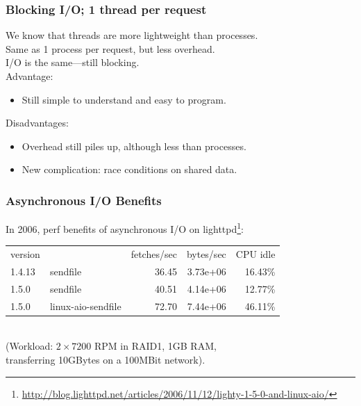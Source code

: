 \begin{frame}
  \frametitle{Blocking I/O; 1 thread per request}

  
    We know that threads are more lightweight than processes.\\[1em]

    Same as 1 process per request, but less overhead.\\[1em]

    I/O is the same---still blocking.\\[1em]

    Advantage:
    \begin{itemize}
      \item Still simple to understand and easy to program.
    \end{itemize}

    Disadvantages:
    \begin{itemize}
      \item Overhead still piles up, although less than processes.
      \item New complication: race conditions on shared data.
    \end{itemize}
  
\end{frame}

\begin{frame}
  \frametitle{Asynchronous I/O Benefits}

  
    In 2006, perf benefits of asynchronous I/O on lighttpd\footnote{\tiny \url{http://blog.lighttpd.net/articles/2006/11/12/lighty-1-5-0-and-linux-aio/}}:\\

{\small
    \begin{tabular}{llrrr}
    version & & fetches/sec & bytes/sec & CPU idle \\
    1.4.13 & sendfile & 36.45 & 3.73e+06 & 16.43\% \\
    1.5.0 & sendfile & 40.51 & 4.14e+06 & 12.77\% \\
    1.5.0 & linux-aio-sendfile & 72.70 & 7.44e+06 & 46.11\% \\
    \end{tabular}
}~\\[1em]

    (Workload: $2\times 7200$ RPM in RAID1, 1GB RAM, \\
     \qquad transferring 10GBytes on a 100MBit network).\\[1em]
  
\end{frame}

